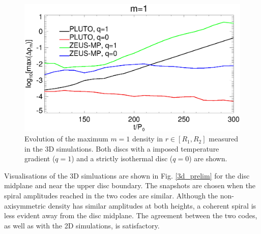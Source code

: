 \begin{figure}
  \includegraphics[width=\linewidth]{figures/m1_analysis_plot_ampmax3d.ps}
  \caption{Evolution of the maximum $m=1$ density in  $r\in[R_1,R_2]$
    measured in the 3D simulations. Both discs with a imposed
    temperature gradient ($q=1$) and a strictly isothermal disc
    ($q=0$) are shown. 
    \label{3d_ampmax}}   
\end{figure}

Visualisations of the 3D simluations are shown in
Fig. \ref{3d_prelim} for the disc midplane and near the upper disc
boundary. The snapshots are chosen when the spiral 
amplitudes reached in the two codes are similar. Although the
non-axisymmetric density has similar amplitudes at both heights, a
coherent spiral is less evident away from the disc midplane. 
The agreement between the two codes, as well as with the 2D
simulations, is satisfactory.   

